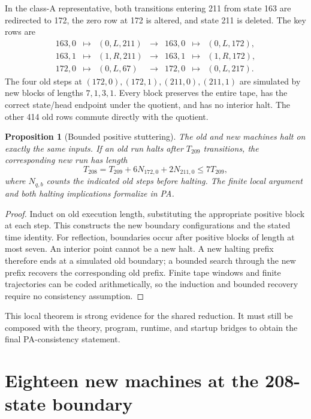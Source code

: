 \documentclass[11pt,a4paper]{article}
\newtheorem{proposition}[theorem]{Proposition}
\begin{document}
In the class-A representative, both transitions entering 211 from state
163 are redirected to 172, the zero row at 172 is altered, and state 211
is deleted. The key rows are
\[
\begin{array}{rclcrcl}
163,0&\mapsto&(0,L,211)&\longrightarrow&163,0&\mapsto&(0,L,172),\\
163,1&\mapsto&(1,R,211)&\longrightarrow&163,1&\mapsto&(1,R,172),\\
172,0&\mapsto&(0,L,67)&\longrightarrow&172,0&\mapsto&(0,L,217).
\end{array}
\]
The four old steps at $(172,0),(172,1),(211,0),(211,1)$ are simulated by
new blocks of lengths $7,1,3,1$. Every block preserves the entire tape,
has the correct state/head endpoint under the quotient, and has no interior
halt. The other 414 old rows commute directly with the quotient.

\begin{proposition}[Bounded positive stuttering]
The old and new machines halt on exactly the same inputs. If an old run
halts after $T_{209}$ transitions, the corresponding new run has length
\[
T_{208}=T_{209}+6N_{172,0}+2N_{211,0}\leq 7T_{209},
\]
where $N_{q,b}$ counts the indicated old steps before halting.
The finite local argument and both halting implications formalize in PA.
\end{proposition}

\begin{proof}
Induct on old execution length, substituting the appropriate positive block
at each step. This constructs the new boundary configurations and the stated
time identity. For reflection, boundaries occur after positive blocks of
length at most seven. An interior point cannot be a new halt. A new halting
prefix therefore ends at a simulated old boundary; a bounded search through
the new prefix recovers the corresponding old prefix. Finite tape windows
and finite trajectories can be coded arithmetically, so the induction and
bounded recovery require no consistency assumption.
\end{proof}

This local theorem is strong evidence for the shared reduction. It must
still be composed with the theory, program, runtime, and startup bridges to
obtain the final PA-consistency statement.

\section{Eighteen new machines at the 208-state boundary}\label{sec:helpers}
\end{document}
